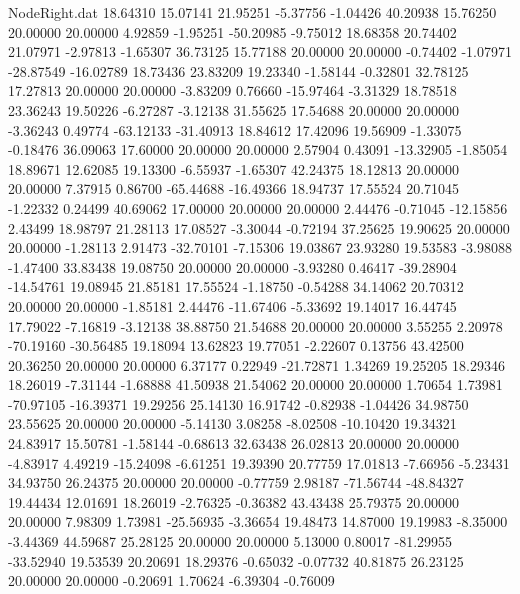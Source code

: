\begin{filecontents}{NodeRight.dat}
  18.64310   15.07141   21.95251    -5.37756   -1.04426   40.20938   15.76250   20.00000   20.00000    4.92859   -1.95251  -50.20985   -9.75012
  18.68358   20.74402   21.07971    -2.97813   -1.65307   36.73125   15.77188   20.00000   20.00000   -0.74402   -1.07971  -28.87549  -16.02789
  18.73436   23.83209   19.23340    -1.58144   -0.32801   32.78125   17.27813   20.00000   20.00000   -3.83209    0.76660  -15.97464   -3.31329
  18.78518   23.36243   19.50226    -6.27287   -3.12138   31.55625   17.54688   20.00000   20.00000   -3.36243    0.49774  -63.12133  -31.40913
  18.84612   17.42096   19.56909    -1.33075   -0.18476   36.09063   17.60000   20.00000   20.00000    2.57904    0.43091  -13.32905   -1.85054
  18.89671   12.62085   19.13300    -6.55937   -1.65307   42.24375   18.12813   20.00000   20.00000    7.37915    0.86700  -65.44688  -16.49366
  18.94737   17.55524   20.71045    -1.22332    0.24499   40.69062   17.00000   20.00000   20.00000    2.44476   -0.71045  -12.15856    2.43499
  18.98797   21.28113   17.08527    -3.30044   -0.72194   37.25625   19.90625   20.00000   20.00000   -1.28113    2.91473  -32.70101   -7.15306
  19.03867   23.93280   19.53583    -3.98088   -1.47400   33.83438   19.08750   20.00000   20.00000   -3.93280    0.46417  -39.28904  -14.54761
  19.08945   21.85181   17.55524    -1.18750   -0.54288   34.14062   20.70312   20.00000   20.00000   -1.85181    2.44476  -11.67406   -5.33692
  19.14017   16.44745   17.79022    -7.16819   -3.12138   38.88750   21.54688   20.00000   20.00000    3.55255    2.20978  -70.19160  -30.56485
  19.18094   13.62823   19.77051    -2.22607    0.13756   43.42500   20.36250   20.00000   20.00000    6.37177    0.22949  -21.72871    1.34269
  19.25205   18.29346   18.26019    -7.31144   -1.68888   41.50938   21.54062   20.00000   20.00000    1.70654    1.73981  -70.97105  -16.39371
  19.29256   25.14130   16.91742    -0.82938   -1.04426   34.98750   23.55625   20.00000   20.00000   -5.14130    3.08258   -8.02508  -10.10420
  19.34321   24.83917   15.50781    -1.58144   -0.68613   32.63438   26.02813   20.00000   20.00000   -4.83917    4.49219  -15.24098   -6.61251
  19.39390   20.77759   17.01813    -7.66956   -5.23431   34.93750   26.24375   20.00000   20.00000   -0.77759    2.98187  -71.56744  -48.84327
  19.44434   12.01691   18.26019    -2.76325   -0.36382   43.43438   25.79375   20.00000   20.00000    7.98309    1.73981  -25.56935   -3.36654
  19.48473   14.87000   19.19983    -8.35000   -3.44369   44.59687   25.28125   20.00000   20.00000    5.13000    0.80017  -81.29955  -33.52940
  19.53539   20.20691   18.29376    -0.65032   -0.07732   40.81875   26.23125   20.00000   20.00000   -0.20691    1.70624   -6.39304   -0.76009

\end{filecontents}
